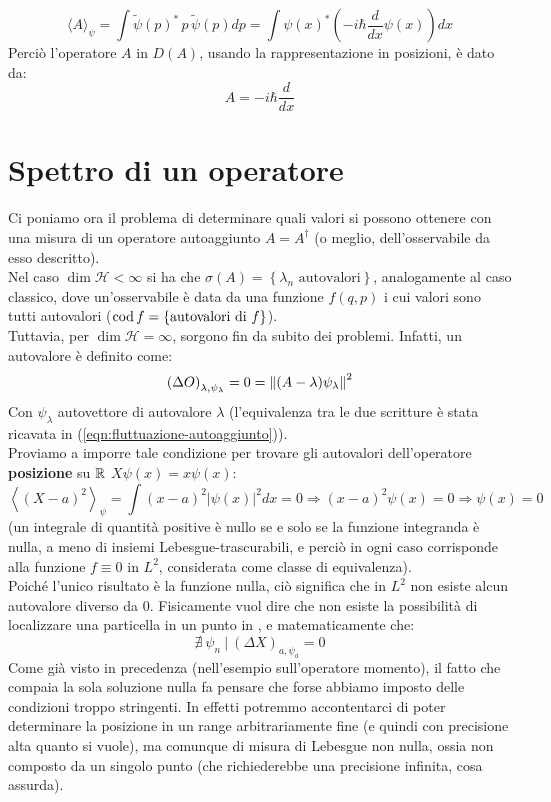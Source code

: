 \documentclass[../../FisicaTeorica.tex]{subfiles}
\begin{document}
\[
\langle A \rangle_\psi = \int \tilde{\psi}(p)^*\,p\,\tilde{\psi}(p) dp= \int \psi(x)^* \left ( -i\hbar \frac{d}{dx} \psi(x) \right ) dx
\]
Perciò l'operatore $A$ in $D(A)$, usando la rappresentazione in posizioni, è dato da:
\[
A = -i\hbar \frac{d}{dx}
\]

\section{Spettro di un operatore}
Ci poniamo ora il problema di determinare quali valori si possono ottenere con una misura di un operatore autoaggiunto $A=A^\dag$ (o meglio, dell'osservabile da esso descritto).\\
Nel caso $\dim{\mathcal{H}}<\infty$ si ha che $\sigma \left(A\right)= \left\{\lambda_n\text{ autovalori}\right\}$, analogamente al caso classico, dove un'osservabile è data da una funzione $f(q,p)$ i cui valori sono tutti autovalori ($\operatorname{cod} f = \{\text{autovalori di }f\}$).\\
Tuttavia, per $\dim{\mathcal{H}}=\infty$, sorgono fin da subito dei problemi.  Infatti, un autovalore è definito come:
\[
\left(\Delta O\right)_{\lambda,\psi_\lambda}=0 = \left\lVert(A-\lambda)\psi_\lambda\right\rVert^2
\]
Con $\psi_\lambda$ autovettore di autovalore $\lambda$ 
(l'equivalenza tra le due scritture è stata ricavata in (\ref{eqn:fluttuazione-autoaggiunto})).\\
Proviamo a imporre tale condizione per trovare gli autovalori dell'operatore \textbf{posizione} su $\mathbb{R}$ $X\psi \left(x\right)=x\psi (x)$:
\[
\left\langle\left(X-a\right)^2\right\rangle_\psi=\int \left(x-a\right)^2\left|\psi\left(x\right)\right|^2dx=0\Rightarrow \left(x-a\right)^2\psi \left(x\right)=0\Rightarrow  \psi \left(x\right)=0 
\]
(un integrale di quantità positive è nullo se e solo se la funzione integranda è nulla, a meno di insiemi Lebesgue-trascurabili, e perciò in ogni caso corrisponde alla funzione $f\equiv 0$ in $L^2$, considerata come classe di equivalenza).\\
Poiché l'unico risultato è la funzione nulla, ciò significa che in $L^2$ non esiste alcun autovalore diverso da $0$. Fisicamente vuol dire che non esiste la possibilità di localizzare una particella in un punto in \MQ, e matematicamente che:
\[
\nexists\> \psi_n\>|\> \left(\Delta X\right)_{a,\psi_a}=0
\]
Come già visto in precedenza (nell'esempio sull'operatore momento), il fatto che compaia la sola soluzione nulla fa pensare che forse abbiamo imposto delle condizioni troppo stringenti. In effetti potremmo accontentarci di poter determinare la posizione in un range arbitrariamente fine (e quindi con precisione alta quanto si vuole), ma comunque di misura di Lebesgue non nulla, ossia non composto da un singolo punto (che richiederebbe una precisione infinita, cosa assurda).\\
\end{document}

